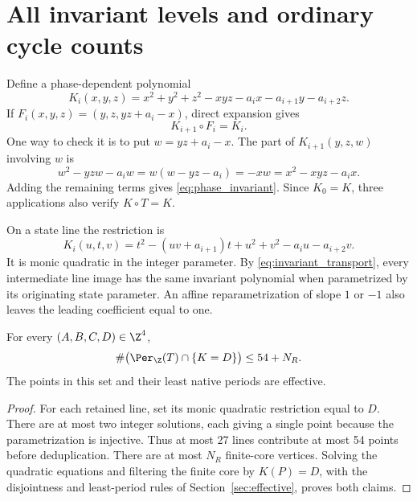 \section{All invariant levels and ordinary cycle counts}\label{sec:levels}

Define a phase-dependent polynomial
\begin{equation}\label{eq:phase_invariant}
 K_i(x,y,z)=x^2+y^2+z^2-xyz-a_ix-a_{i+1}y-a_{i+2}z.
\end{equation}
If \(F_i(x,y,z)=(y,z,yz+a_i-x)\), direct expansion gives
\begin{equation}\label{eq:invariant_transport}
 K_{i+1}\circ F_i=K_i.
\end{equation}
One way to check it is to put \(w=yz+a_i-x\). The part of
\(K_{i+1}(y,z,w)\) involving \(w\) is
\[
 w^2-yzw-a_iw=w(w-yz-a_i)=-xw
                =x^2-xyz-a_ix.
\]
Adding the remaining terms gives \eqref{eq:phase_invariant}.
Since \(K_0=K\), three applications also verify \(K\circ T=K\).

On a state line the restriction is
\begin{equation}\label{eq:quadratic_level}
 K_i(u,t,v)
 =t^2-(uv+a_{i+1})t+u^2+v^2-a_iu-a_{i+2}v.
\end{equation}
It is monic quadratic in the integer parameter. By
\eqref{eq:invariant_transport}, every intermediate line image has the
same invariant polynomial when parametrized by its originating state
parameter. An affine reparametrization of slope \(1\) or \(-1\)
also leaves the leading coefficient equal to one.

\begin{corollary}\label{cor:level}
For every \((A,B,C,D)\in\Z^4\),
\[
 \#\bigl(\Per_\Z(T)\cap\{K=D\}\bigr)\le54+N_R.
\]
The points in this set and their least native periods are effective.
\end{corollary}

\begin{proof}
For each retained line, set its monic quadratic restriction equal to
\(D\). There are at most two integer solutions, each giving a single
point because the parametrization is injective. Thus at most 27 lines
contribute at most 54 points before deduplication. There are at most
\(N_R\) finite-core vertices. Solving the quadratic equations and
filtering the finite core by \(K(P)=D\), with the disjointness and
least-period rules of Section~\ref{sec:effective}, proves both claims.
\end{proof}

